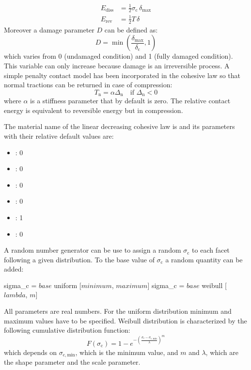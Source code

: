 \begin{align}
  E_\mathrm{diss} &= \frac{1}{2} \sigma_\mathrm{c}\, \delta_\mathrm{max}\\[1ex]
  E_\mathrm{rev} &= \frac{1}{2} T\, \delta
\end{align}
Moreover a damage parameter $D$ can be defined as:
\begin{equation}
  D = \min \left(
    \frac{\delta_\mathrm{max}}{\delta_\mathrm{c}},1 \right)
\end{equation} which varies from 0 (undamaged condition) and 1 (fully
damaged condition). This variable can only increase because damage is
an irreversible process. A simple penalty contact model has been incorporated
in the cohesive law so that normal tractions can be returned in
case of compression:
\begin{equation}
  T_\mathrm{n} = \alpha \Delta_\mathrm{n} \quad\text{if
    $\Delta_\mathrm{n} < 0$}
\end{equation}
where $\alpha$ is a stiffness parameter that by default is zero. The
relative contact energy is equivalent to reversible energy but in
compression.

The material name of the linear decreasing cohesive law  is
 and its parameters with their
relative default values are:
\begin{itemize}
\item {}: 0
\item {}: 0
\item {}: 0
\item {}: 0
\item {}: 1
\item {}: 0
\end{itemize}
A random number generator can be use to assign a random
$\sigma_\mathrm{c}$ to each facet following a given distribution. To
the base value of $\sigma_\mathrm{c}$ a random quantity can be added:
\begin{cpp}
  sigma_c = $base$ uniform [$minimum$, $maximum$]
  sigma_c = $base$ weibull [$lambda$, $m$]
\end{cpp}
All parameters are real numbers. For the uniform distribution minimum
and maximum values have to be specified. Weibull distribution is
characterized by the following cumulative distribution function:
\begin{equation}
    F(\sigma_\mathrm{c}) = 1- e^{-\left(
      \frac{\sigma_c-\sigma_\mathrm{c, min}}{\lambda} \right)^m}
\end{equation}
which depends on $\sigma_\mathrm{c, min}$, which is the minimum value,
and $m$ and $\lambda$, which are the shape parameter and the scale
parameter.

